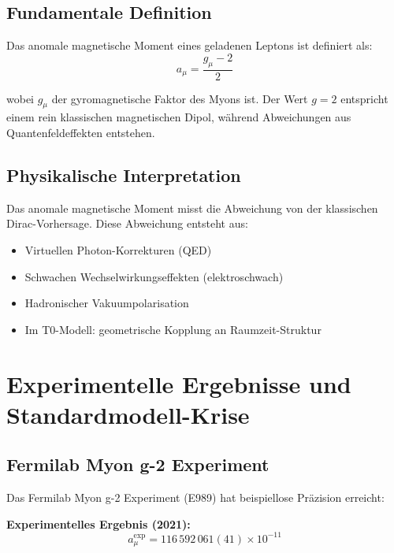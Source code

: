 \documentclass[12pt,a4paper]{report}
\begin{document}
	\subsection{Fundamentale Definition}
	\label{subsec:fundamental_definition}
	
	Das anomale magnetische Moment eines geladenen Leptons ist definiert als:
	\begin{equation}
		a_\mu = \frac{g_\mu - 2}{2}
		\label{eq:anomalous_moment_definition}
	\end{equation}
	
	wobei $g_\mu$ der gyromagnetische Faktor des Myons ist. Der Wert $g = 2$ entspricht einem rein klassischen magnetischen Dipol, während Abweichungen aus Quantenfeldeffekten entstehen.
	
	\subsection{Physikalische Interpretation}
	\label{subsec:physical_interpretation}
	
	Das anomale magnetische Moment misst die Abweichung von der klassischen Dirac-Vorhersage. Diese Abweichung entsteht aus:
	\begin{itemize}
		\item Virtuellen Photon-Korrekturen (QED)
		\item Schwachen Wechselwirkungseffekten (elektroschwach)
		\item Hadronischer Vakuumpolarisation
		\item Im T0-Modell: geometrische Kopplung an Raumzeit-Struktur
	\end{itemize}
	
	\section{Experimentelle Ergebnisse und Standardmodell-Krise}
	\label{sec:experimental_results}
	
	\subsection{Fermilab Myon g-2 Experiment}
	\label{subsec:fermilab_results}
	
	Das Fermilab Myon g-2 Experiment (E989) hat beispiellose Präzision erreicht:
	
	\textbf{Experimentelles Ergebnis (2021):}
	\begin{equation}
		a_\mu^{\text{exp}} = 116\,592\,061(41) \times 10^{-11}
		\label{eq:experimental_value}
	\end{equation}
	
\end{document}
